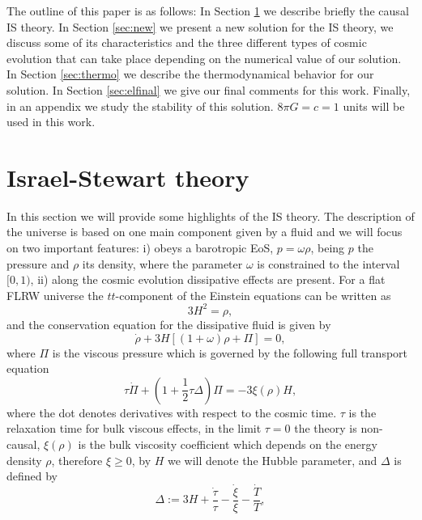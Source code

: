 \documentclass[twocolumn,showpacs,nofootinbib,floats,amsmath,amssymb]{revtex4}
\begin{document}
The outline of this paper is as follows: In Section \ref{sec:IStheory} we describe briefly the causal IS theory. In Section \ref{sec:new} we present a new solution for the IS theory, we discuss some of its characteristics and the three different types of cosmic evolution that can take place depending on the numerical value of our solution. In Section \ref{sec:thermo} we describe the thermodynamical behavior for our solution. In Section \ref{sec:elfinal} we give our final comments for this work. Finally, in an appendix we study the stability of this solution. $8\pi G=c=1$ units will be used in this work.

\section{Israel-Stewart theory}
\label{sec:IStheory}
In this section we will provide some highlights of the IS theory. The description of the universe is based on one main component given by a fluid and we will focus on two important features: i) obeys a barotropic EoS, $p = \omega \rho$, being $p$ the pressure and $\rho$ its density, where the parameter $\omega$ is constrained to the interval $[0,1)$, ii) along the cosmic evolution dissipative effects are present. For a flat FLRW universe the $tt$-component of the Einstein equations can be written as
\begin{equation}
3H^{2} = \rho, 
\label{eq:eq0}
\end{equation}
and the conservation equation for the dissipative fluid is given by
\begin{equation}
\dot{\rho} + 3H\left[ \left( 1+\omega \right) \rho +\Pi \right] =0,
\label{eq:eq18}
\end{equation}
where $\Pi$ is the viscous pressure which is governed by the following full transport equation \cite{Israel1979}
\begin{equation}
\tau \dot{\Pi}+\left( 1+\frac{1}{2}\tau \Delta \right) \Pi = -3 \xi (\rho) H, 
\label{eq:eq1}
\end{equation}
where the dot denotes derivatives with respect to the cosmic time. $\tau$ is the relaxation time for bulk viscous effects, in the limit $\tau = 0$ the theory is non-causal, $\xi(\rho)$ is the bulk
viscosity coefficient which depends on the energy density $\rho$, therefore $\xi \geq 0$, by $H$ we will denote the Hubble parameter, and $\Delta$ is defined by
\begin{equation}
\Delta := 3H+\frac{\dot{\tau}}{\tau }-\frac{\dot{\xi}}{\xi}-\frac{\dot{T}}{T}, 
\label{eq:eq2}
\end{equation}
\end{document}
